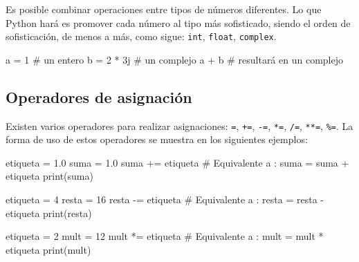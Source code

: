 \documentclass[
  letterpaper,
  DIV=11,
  numbers=noendperiod]{scrreprt}
\newenvironment{Shaded}{\begin{snugshade}}{\end{snugshade}}
\newcommand{\BuiltInTok}[1]{\textcolor[rgb]{0.00,0.23,0.31}{#1}}
\newcommand{\CommentTok}[1]{\textcolor[rgb]{0.37,0.37,0.37}{#1}}
\newcommand{\DecValTok}[1]{\textcolor[rgb]{0.68,0.00,0.00}{#1}}
\newcommand{\FloatTok}[1]{\textcolor[rgb]{0.68,0.00,0.00}{#1}}
\newcommand{\NormalTok}[1]{\textcolor[rgb]{0.00,0.23,0.31}{#1}}
\newcommand{\OperatorTok}[1]{\textcolor[rgb]{0.37,0.37,0.37}{#1}}
\newcommand{\OtherTok}[1]{\textcolor[rgb]{0.00,0.23,0.31}{#1}}
\begin{document}
Es posible combinar operaciones entre tipos de números diferentes. Lo
que Python hará es promover cada número al tipo más sofisticado, siendo
el orden de sofisticación, de menos a más, como sigue: \texttt{int},
\texttt{float}, \texttt{complex}.

\begin{Shaded}
\begin{Highlighting}[]
\NormalTok{a }\OperatorTok{=} \DecValTok{1} \CommentTok{\# un entero}
\NormalTok{b }\OperatorTok{=} \DecValTok{2} \OperatorTok{*} \OtherTok{3j} \CommentTok{\# un complejo}
\NormalTok{a }\OperatorTok{+}\NormalTok{ b  }\CommentTok{\# resultará en un complejo}
\end{Highlighting}
\end{Shaded}

\subsection{Operadores de asignación}\label{operadores-de-asignaciuxf3n}

Existen varios operadores para realizar asignaciones: \texttt{=},
\texttt{+=}, \texttt{-=}, \texttt{*=}, \texttt{/=}, \texttt{**=},
\texttt{\%=}. La forma de uso de estos operadores se muestra en los
siguientes ejemplos:

\begin{Shaded}
\begin{Highlighting}[]
\NormalTok{etiqueta }\OperatorTok{=} \FloatTok{1.0} 
\NormalTok{suma }\OperatorTok{=} \FloatTok{1.0}
\NormalTok{suma }\OperatorTok{+=}\NormalTok{ etiqueta  }\CommentTok{\# Equivalente a : suma = suma + etiqueta}
\BuiltInTok{print}\NormalTok{(suma)}
\end{Highlighting}
\end{Shaded}

\begin{Shaded}
\begin{Highlighting}[]
\NormalTok{etiqueta }\OperatorTok{=}  \DecValTok{4}
\NormalTok{resta }\OperatorTok{=} \DecValTok{16}
\NormalTok{resta }\OperatorTok{{-}=}\NormalTok{ etiqueta }\CommentTok{\# Equivalente a : resta = resta {-} etiqueta}
\BuiltInTok{print}\NormalTok{(resta)}
\end{Highlighting}
\end{Shaded}

\begin{Shaded}
\begin{Highlighting}[]
\NormalTok{etiqueta }\OperatorTok{=} \DecValTok{2}
\NormalTok{mult }\OperatorTok{=} \DecValTok{12}
\NormalTok{mult }\OperatorTok{*=}\NormalTok{ etiqueta  }\CommentTok{\# Equivalente a : mult = mult * etiqueta}
\BuiltInTok{print}\NormalTok{(mult)}
\end{Highlighting}
\end{Shaded}
\end{document}
